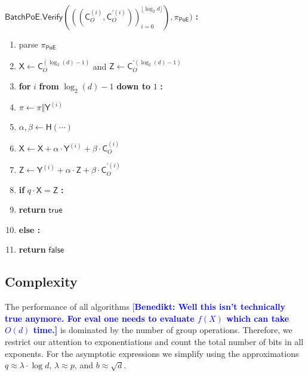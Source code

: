 \documentclass{article}
\theoremstyle{Definition}
\newcommand{\benedikt}[1]{{\textcolor{blue}{[\bf Benedikt: #1]}}}
\begin{document}
\begin{mdframed}
$\mathsf{BatchPoE.Verify}(((\mathsf{C}_O^{(i)}, \mathsf{C}_O^{\prime(i)}))_{i=0}^{\lfloor \log_2 d \rfloor}), \pi_{\mathsf{PoE}})$ \textbf{:}
\begin{enumerate}[nolistsep]
	\item parse $\pi_{\mathsf{PoE}}$
	\item $\mathsf{X} \gets \mathsf{C}_O^{(\log_2(d)-1)}$ and $\mathsf{Z} \gets \mathsf{C}_O^{\prime(\log_2(d)-1)}$
	\item \textbf{for} $i$ \textbf{from} $\log_2(d) - 1$ \textbf{down to} $1$ \textbf{:}
	\item \pcind $\pi \gets \pi \Vert \mathsf{Y}^{(i)}$
	\item \pcind $\alpha, \beta \gets \mathsf{H}(\cdots)$
	\item \pcind $\mathsf{X} \gets \mathsf{X} + \alpha \cdot \mathsf{Y}^{(i)} + \beta \cdot \mathsf{C}_O^{(i)}$
	\item \pcind $\mathsf{Z} \gets \mathsf{Y}^{(i)} + \alpha \cdot \mathsf{Z} + \beta \cdot \mathsf{C}_O^{\prime(i)}$
	\item \textbf{if} $q \cdot \mathsf{X} = \mathsf{Z}$ \textbf{:}
	\item \pcind \textbf{return} $\mathsf{true}$
	\item \textbf{else :}
	\item \pcind \textbf{return} $\mathsf{false}$
\end{enumerate}
\end{mdframed}

\subsection{Complexity}

The performance of all algorithms \benedikt{Well this isn't technically true anymore. For eval one needs to evaluate $f(X)$ which can take $O(d)$ time.} is dominated by the number of group operations. Therefore, we restrict our attention to exponentiations and count the total number of bits in all exponents. For the asymptotic expressions we simplify using the approximations $q \approx \lambda \cdot \log d$, $\lambda \approx p$, and $b \approx \sqrt{d}$.
\end{document}
